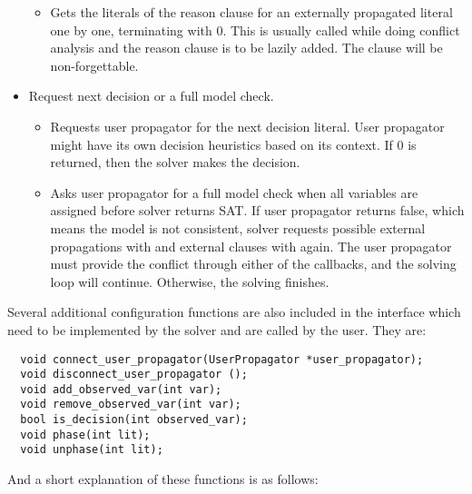 \begin{itemize}
\begin{itemize}
      \item {} Gets the literals of the reason clause for an externally propagated literal one by one, terminating with 0. This is usually called while doing conflict analysis and the reason clause is to be lazily added. The clause will be non-forgettable.
    \end{itemize}
  \item Request next decision or a full model check.
    \begin{itemize}
      \item {} Requests user propagator for the next decision literal. User propagator might have its own decision heuristics based on its context. If 0 is returned, then the solver makes the decision.
      \item {} Asks user propagator for a full model check when all variables are assigned before solver returns SAT. If user propagator returns false, which means the model is not consistent, solver requests possible external propagations with  and external clauses with  again. The user propagator must provide the conflict through either of the callbacks, and the solving loop will continue. Otherwise, the solving finishes.
    \end{itemize}
\end{itemize}

Several additional configuration functions are also included in the interface which need to be implemented by the solver and are called by the user. They are:

\begin{lstlisting}
  void connect_user_propagator(UserPropagator *user_propagator);
  void disconnect_user_propagator ();
  void add_observed_var(int var);
  void remove_observed_var(int var);
  bool is_decision(int observed_var);
  void phase(int lit);
  void unphase(int lit);
\end{lstlisting}

And a short explanation of these functions is as follows:

